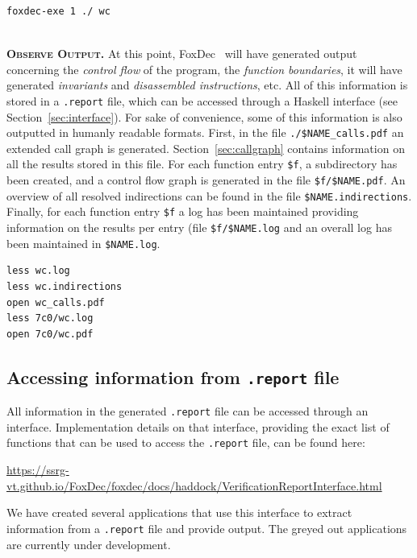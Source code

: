 \documentclass[12pt,a4paper]{article}
\newcommand{\begincodebox}[1]{
\vspace{1ex}
\begin{tcolorbox}[
    enhanced,
    attach boxed title to top left={xshift=6mm,yshift=-3mm},
    colback=moonstoneblue!20,
    colframe=moonstoneblue,
    colbacktitle=moonstoneblue,
    title=#1,
    fonttitle=\bfseries\color{black},
    boxed title style={size=small,colframe=moonstoneblue,sharp corners},
    sharp corners,
]
}
\newcommand{\codeboxend}{\end{tcolorbox}\noindent}
\newcommand{\foxdec}{\textsf{FoxDec}}
\newcommand{\beginpar}[1]{\noindent\textsc{\textbf{#1.}}}
\begin{document}
\begincodebox{Run FoxDec}
\begin{verbatim}
foxdec-exe 1 ./ wc
\end{verbatim}
\codeboxend
\\

\beginpar{Observe Output} 
At this point, \foxdec~ will have generated output concerning the \emph{control flow} of the program, the \emph{function boundaries}, it will have generated \emph{invariants} and \emph{disassembled instructions}, etc.
All of this information is stored in a \texttt{.report} file, which can be accessed through a Haskell interface (see Section~\ref{sec:interface}).
For sake of convenience, some of this information is also outputted in humanly readable formats.
First, in the file \texttt{./\$NAME\_calls.pdf} an extended call graph is generated.
Section~\ref{sec:callgraph} contains information on all the results stored in this file.
For each function entry \texttt{\$f}, a subdirectory has been created, and a control flow graph is generated in the file \texttt{\$f/\$NAME.pdf}.
An overview of all resolved indirections can be found in the file \texttt{\$NAME.indirections}.
Finally, for each function entry \texttt{\$f} a log has been maintained providing information on the results per entry (file \texttt{\$f/\$NAME.log} and an overall log has been maintained in \texttt{\$NAME.log}.

\begincodebox{Observe output}
\begin{verbatim}
less wc.log
less wc.indirections
open wc_calls.pdf
less 7c0/wc.log
open 7c0/wc.pdf
\end{verbatim}
\codeboxend


\subsection{Accessing information from \texttt{.report} file}

All information in the generated \texttt{.report} file can be accessed through an interface.
Implementation details on that interface, providing the exact list of functions that can be used to access the \texttt{.report} file, can be found here:
\begin{center}
\url{https://ssrg-vt.github.io/FoxDec/foxdec/docs/haddock/VerificationReportInterface.html}
\end{center}

We have created several applications that use this interface to extract information from a \texttt{.report} file and provide output.
The greyed out applications are currently under development.
\\
\end{document}
